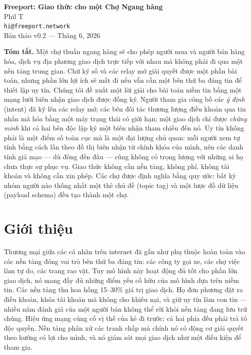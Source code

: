 \documentclass[11pt]{article}
\begin{document}
\begin{center}
{\Large\bfseries Freeport: Giao thức cho một Chợ Ngang hàng}\\[10pt]
{\normalsize Phil T}\\[2pt]
{\small\texttt{hi@freeport.network}}\\[8pt]
{\small Bản thảo v0.2 --- Tháng 6, 2026}
\end{center}

\vspace{14pt}

\begin{center}
\begin{minipage}{0.88\textwidth}
\small
\textbf{Tóm tắt.} Một chợ thuần ngang hàng sẽ cho phép người mua và người
bán hàng hóa, dịch vụ địa phương giao dịch trực tiếp với nhau mà không phải
đi qua một nền tảng trung gian. Chữ ký số và các relay mở giải quyết được một
phần bài toán, nhưng phần lớn lợi ích sẽ mất đi nếu vẫn cần một bên thứ ba
đáng tin để thiết lập uy tín. Chúng tôi đề xuất một lời giải cho bài toán
niềm tin bằng một mạng lưới biên nhận giao dịch được đồng ký. Người tham gia
công bố các \emph{ý định} (intent) đã ký lên các relay mở; các bên đối tác
thương lượng điều khoản qua tin nhắn mã hóa bằng một máy trạng thái có giới
hạn; một giao dịch chỉ được \emph{chứng minh} khi cả hai bên độc lập ký một
biên nhận tham chiếu đến nó. Uy tín không phải là một điểm số toàn cục mà là
một đại lượng chủ quan: mỗi người xem tự tính bằng cách lần theo đồ thị biên
nhận từ chính khóa của mình, nên các danh tính giả mạo --- dù đông đến đâu ---
cũng không có trọng lượng với những ai họ chưa thực sự phục vụ. Giao thức
không cần nền tảng, không phí, không tài khoản và không cần xin phép. Các chợ
được định nghĩa bằng quy ước: bất kỳ nhóm người nào thống nhất một thẻ chủ đề
(topic tag) và một lược đồ dữ liệu (payload schema) đều tạo thành một chợ.
\end{minipage}
\end{center}

\section{Giới thiệu}

Thương mại giữa các cá nhân trên internet đã gần như phụ thuộc hoàn toàn vào
các nền tảng đóng vai trò bên thứ ba đáng tin: các công ty gọi xe, các chợ
việc làm tự do, các trang rao vặt. Tuy mô hình này hoạt động đủ tốt cho phần
lớn giao dịch, nó mang đầy đủ những điểm yếu cố hữu của mô hình dựa trên niềm
tin. Các nền tảng thu hoa hồng 15--30\% giá trị giao dịch. Họ đơn phương đặt
ra điều khoản, khóa tài khoản mà không cho khiếu nại, và giữ uy tín làm con
tin --- nhiều năm đánh giá của một người bán không thể rời khỏi nền tảng đang
lưu trữ chúng. Hiệu ứng mạng củng cố vị thế của kẻ đi trước; cả hai phía đều
phải trả tô độc quyền. Nền tảng phân xử các tranh chấp mà chính nó có động cơ
giải quyết theo hướng có lợi cho mình, và nó giám sát mọi giao dịch như một
điều kiện để tham gia.
\end{document}
